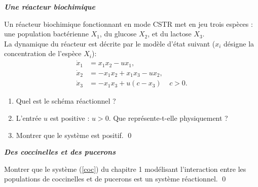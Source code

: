 \begin{exercice}{\bf \em Une réacteur biochimique}

Un réacteur biochimique fonctionnant en mode CSTR met en jeu trois
espèces : une population bactérienne $X_1$, du glucose $X_2$,
et du lactose $X_3$.\\

La dynamique du réacteur est décrite par le modèle d'état suivant
($x_i$ désigne la concentration de l'espèce $X_i$): 
\begin{equation*} \begin{split}
\dot x_1 &= x_1x_2-ux_1,\\
\dot x_2 &= -x_1x_2 +x_1x_3 -ux_2,\\
\dot x_3 &= -x_1x_3 +u(c-x_3) \;\;\;\; c>0. 
\end{split} \end{equation*}

\begin{enumerate}
\item Quel est le schéma réactionnel ?
\item L'entrée $u$ est positive :  $u>0$.  Que représente-t-elle physiquement ?
\item Montrer que le système est positif. \qed
\end{enumerate}
\end{exercice}
\vv

\begin{exercice}{\bf \em Des coccinelles et des pucerons}

Montrer que le système (\ref{coc}) du chapitre 1 modélisant l'interaction entre les populations de coccinelles et de pucerons est un système réactionnel. \qed
\end{exercice}
\vv

